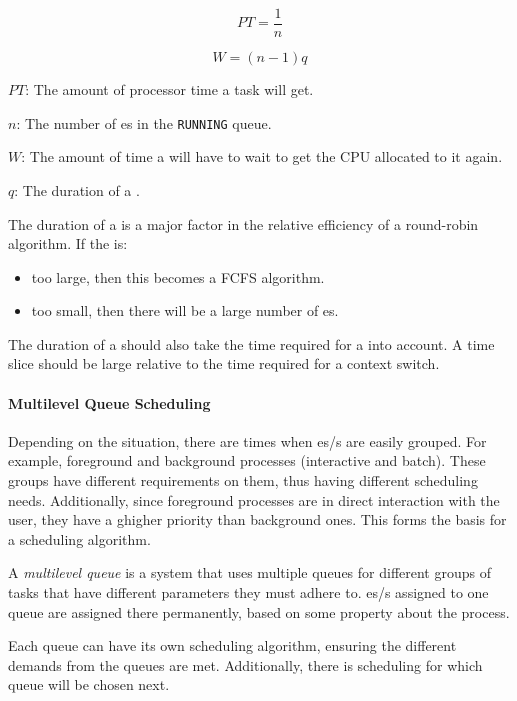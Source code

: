 \begin{equation}\label{eq:RR_Process_Time}
  PT = \frac{1}{n}
\end{equation}

\begin{equation}\label{eq:RR_Max_Wait}
  W = (n-1)q
\end{equation}

\begin{description}[noitemsep]
\item $PT$: The amount of processor time a task will get.
\item $n$: The number of es in the \texttt{RUNNING} queue.
\item $W$: The amount of time a  will have to wait to get the CPU allocated to it again.
\item $q$: The duration of a .
\end{description}

The duration of a  is a major factor in the relative efficiency of a round-robin algorithm.
If the  is:
\begin{itemize}[noitemsep]
\item too large, then this becomes a FCFS algorithm.
\item too small, then there will be a large number of es.
\end{itemize}

The duration of a  should also take the time required for a  into account.
A time slice should be large relative to the time required for a context switch.

\paragraph{Multilevel Queue Scheduling}\label{par:Multilevel_Queue_Scheduling}
Depending on the situation, there are times when es/s are easily grouped.
For example, foreground and background processes (interactive and batch).
These groups have different requirements on them, thus having different scheduling needs.
Additionally, since foreground processes are in direct interaction with the user, they have a ghigher priority than background ones.
This forms the basis for a  scheduling algorithm.

\begin{definition}\label{def:Multilevel_Queue}
  A \emph{multilevel queue} is a system that uses multiple queues for different groups of tasks that have different parameters they must adhere to.
  es/s assigned to one queue are assigned there permanently, based on some property about the process.

  Each queue can have its own scheduling algorithm, ensuring the different demands from the queues are met.
  Additionally, there is scheduling for which queue will be chosen next.
\end{definition}

